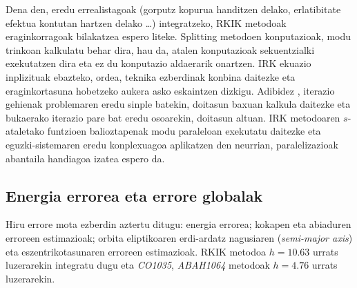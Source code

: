 

Dena den, eredu errealistagoak (gorputz kopurua handitzen delako,  erlatibitate efektua kontutan hartzen delako \dots) integratzeko, RKIK metodoak eraginkorragoak bilakatzea espero liteke. Splitting metodoen konputazioak, modu trinkoan kalkulatu behar dira, hau da, atalen konputazioak sekuentzialki exekutatzen dira eta  ez du konputazio aldaerarik onartzen. IRK ekuazio inplizituak ebazteko, ordea, teknika ezberdinak konbina daitezke eta eraginkortasuna hobetzeko aukera asko eskaintzen dizkigu. Adibidez \cite{Beylkin2014}, iterazio gehienak problemaren eredu sinple batekin, doitasun baxuan kalkula daitezke  eta bukaerako iterazio pare bat eredu osoarekin, doitasun altuan. IRK metodoaren $s$-ataletako funtzioen balioztapenak  modu paraleloan exekutatu daitezke eta eguzki-sistemaren eredu konplexuagoa aplikatzen den neurrian, paralelizazioak abantaila handiagoa izatea espero da.


\subsection*{Energia errorea eta errore globalak}

Hiru errore mota ezberdin aztertu ditugu: energia errorea; kokapen eta abiaduren erroreen estimazioak; orbita eliptikoaren erdi-ardatz nagusiaren (\emph{semi-major axis}) eta eszentrikotasunaren erroreen estimazioak. RKIK metodoa $h=10.63$ urrats luzerarekin integratu dugu eta  \emph{CO1035}, \emph{ABAH1064} metodoak $h=4.76$ urrats luzerarekin.


